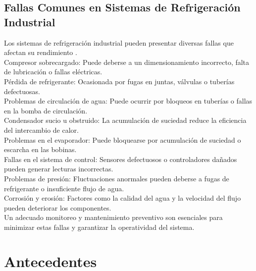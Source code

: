   \subsection{Fallas Comunes en Sistemas de Refrigeración Industrial}
  Los sistemas de refrigeración industrial pueden presentar diversas fallas que afectan su rendimiento \cite{Zamo}.\\
  Compresor sobrecargado: Puede deberse a un dimensionamiento incorrecto, falta de lubricación o fallas eléctricas.\\
  Pérdida de refrigerante: Ocasionada por fugas en juntas, válvulas o tuberías defectuosas.\\
  Problemas de circulación de agua: Puede ocurrir por bloqueos en tuberías o fallas en la bomba de circulación.\\
  Condensador sucio u obstruido: La acumulación de suciedad reduce la eficiencia del intercambio de calor.\\
  Problemas en el evaporador: Puede bloquearse por acumulación de suciedad o escarcha en las bobinas.\\
  Fallas en el sistema de control: Sensores defectuosos o controladores dañados pueden generar lecturas incorrectas.\\
  Problemas de presión: Fluctuaciones anormales pueden deberse a fugas de refrigerante o insuficiente flujo de agua.\\
  Corrosión y erosión: Factores como la calidad del agua y la velocidad del flujo pueden deteriorar los componentes.\\
  Un adecuado monitoreo y mantenimiento preventivo son esenciales para minimizar estas fallas y garantizar la operatividad del sistema.\\
  
\section{Antecedentes}
